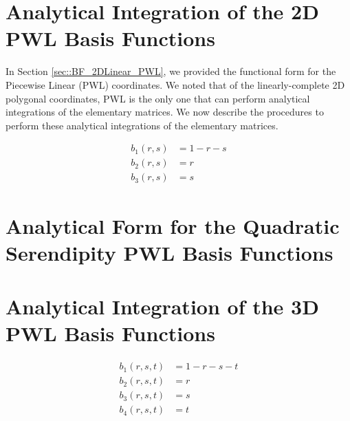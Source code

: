 \section{Analytical Integration of the 2D PWL Basis Functions}
\label{sec::appendix_BF_PWL2}

In Section \ref{sec::BF_2DLinear_PWL}, we provided the functional form for the Piecewise Linear (PWL) coordinates. We noted that of the linearly-complete 2D polygonal coordinates, PWL is the only one that can perform analytical integrations of the elementary matrices. We now describe the procedures to perform these analytical integrations of the elementary matrices.


\begin{equation}
\label{eq::2D_tri_ref_BF}
\begin{aligned}
	b_1(r,s) & = 1-r-s \\
	b_2(r,s) & = r \\
	b_3(r,s) & = s 
\end{aligned}
\end{equation}

\section{Analytical Form for the Quadratic Serendipity PWL Basis Functions}
\label{sec::appendix_BF_PWQ}

\section{Analytical Integration of the 3D PWL Basis Functions}
\label{sec::appendix_BF_PWL3}



\begin{equation}
\label{eq::3D_tetref_BF}
\begin{aligned}
	b_1(r,s,t) & = 1-r-s-t \\
	b_2(r,s,t) & = r \\
	b_3(r,s,t) & = s \\
	b_4(r,s,t) & = t
\end{aligned}
\end{equation}

